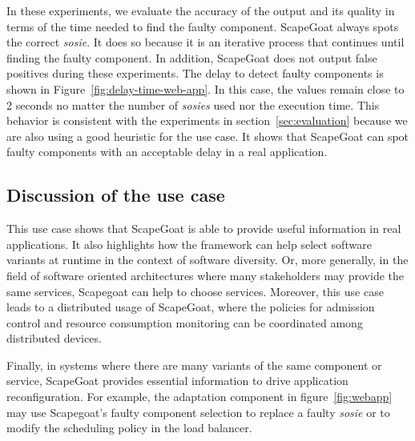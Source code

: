

In these experiments, we evaluate the accuracy of the output and its quality in terms of the time needed to find the faulty component.
ScapeGoat always spots the correct \textit{sosie}.
It does so because it is an iterative process that continues until finding the faulty component.
In addition, ScapeGoat does not output false positives during these experiments.
The delay to detect faulty components is shown in Figure~\ref{fig:delay-time-web-app}.
In this case, the values remain close to 2 seconds no matter the number of \textit{sosies} used nor the execution time.
This behavior is consistent with the experiments in section~\ref{sec:evaluation} because we are also using a good heuristic for the use case.
It shows that ScapeGoat can spot faulty components with an acceptable delay in a real application.

\subsection{Discussion of the use case}
This use case shows that ScapeGoat is able to provide useful information in real applications.
It also highlights how the framework can help select software variants at runtime in the context of software diversity.
Or, more generally, in the field of software oriented architectures where many stakeholders may provide the same services, Scapegoat can help to choose services.
Moreover, this use case leads to a distributed usage of ScapeGoat, where the policies for admission control and resource consumption monitoring can be coordinated among distributed devices.

Finally, in systems where there are many variants of the same component or service, ScapeGoat provides essential information to drive application reconfiguration.
For example, the adaptation component in figure~\ref{fig:webapp} may use Scapegoat's faulty component selection to replace a faulty \textit{sosie} or to modify the scheduling policy in the load balancer.




